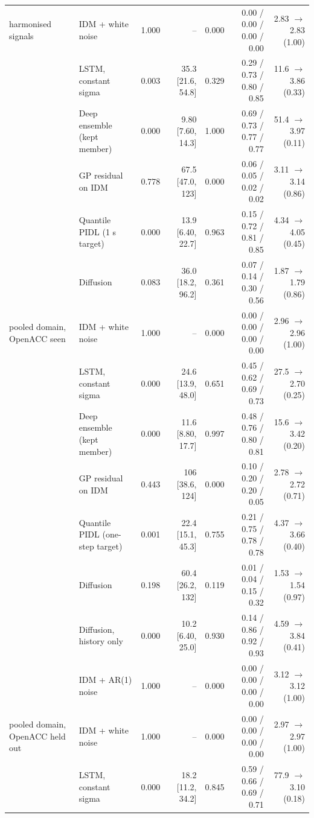 \begin{longtable}{llrrrrr}
\midrule
harmonised signals & IDM + white noise & 1.000 & -- & 0.000 & 0.00 / 0.00 / 0.00 / 0.00 & 2.83 $\rightarrow$ 2.83 (1.00) \\
 & LSTM, constant sigma & 0.003 & 35.3 [21.6, 54.8] & 0.329 & 0.29 / 0.73 / 0.80 / 0.85 & 11.6 $\rightarrow$ 3.86 (0.33) \\
 & Deep ensemble (kept member) & 0.000 & 9.80 [7.60, 14.3] & 1.000 & 0.69 / 0.73 / 0.77 / 0.77 & 51.4 $\rightarrow$ 3.97 (0.11) \\
 & GP residual on IDM & 0.778 & 67.5 [47.0, 123] & 0.000 & 0.06 / 0.05 / 0.02 / 0.02 & 3.11 $\rightarrow$ 3.14 (0.86) \\
 & Quantile PIDL (1 s target) & 0.000 & 13.9 [6.40, 22.7] & 0.963 & 0.15 / 0.72 / 0.81 / 0.85 & 4.34 $\rightarrow$ 4.05 (0.45) \\
 & Diffusion & 0.083 & 36.0 [18.2, 96.2] & 0.361 & 0.07 / 0.14 / 0.30 / 0.56 & 1.87 $\rightarrow$ 1.79 (0.86) \\
\midrule
pooled domain, OpenACC seen & IDM + white noise & 1.000 & -- & 0.000 & 0.00 / 0.00 / 0.00 / 0.00 & 2.96 $\rightarrow$ 2.96 (1.00) \\
 & LSTM, constant sigma & 0.000 & 24.6 [13.9, 48.0] & 0.651 & 0.45 / 0.62 / 0.69 / 0.73 & 27.5 $\rightarrow$ 2.70 (0.25) \\
 & Deep ensemble (kept member) & 0.000 & 11.6 [8.80, 17.7] & 0.997 & 0.48 / 0.76 / 0.80 / 0.81 & 15.6 $\rightarrow$ 3.42 (0.20) \\
 & GP residual on IDM & 0.443 & 106 [38.6, 124] & 0.000 & 0.10 / 0.20 / 0.20 / 0.05 & 2.78 $\rightarrow$ 2.72 (0.71) \\
 & Quantile PIDL (one-step target) & 0.001 & 22.4 [15.1, 45.3] & 0.755 & 0.21 / 0.75 / 0.78 / 0.78 & 4.37 $\rightarrow$ 3.66 (0.40) \\
 & Diffusion & 0.198 & 60.4 [26.2, 132] & 0.119 & 0.01 / 0.04 / 0.15 / 0.32 & 1.53 $\rightarrow$ 1.54 (0.97) \\
 & Diffusion, history only & 0.000 & 10.2 [6.40, 25.0] & 0.930 & 0.14 / 0.86 / 0.92 / 0.93 & 4.59 $\rightarrow$ 3.84 (0.41) \\
 & IDM + AR(1) noise & 1.000 & -- & 0.000 & 0.00 / 0.00 / 0.00 / 0.00 & 3.12 $\rightarrow$ 3.12 (1.00) \\
\midrule
pooled domain, OpenACC held out & IDM + white noise & 1.000 & -- & 0.000 & 0.00 / 0.00 / 0.00 / 0.00 & 2.97 $\rightarrow$ 2.97 (1.00) \\
 & LSTM, constant sigma & 0.000 & 18.2 [11.2, 34.2] & 0.845 & 0.59 / 0.66 / 0.69 / 0.71 & 77.9 $\rightarrow$ 3.10 (0.18) \\

\end{longtable}
